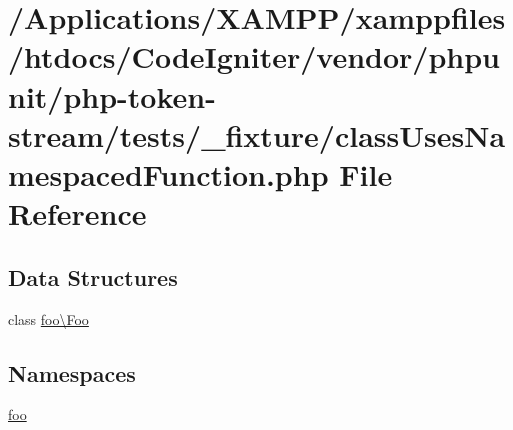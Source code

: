 \hypertarget{class_uses_namespaced_function_8php}{}\section{/\+Applications/\+X\+A\+M\+P\+P/xamppfiles/htdocs/\+Code\+Igniter/vendor/phpunit/php-\/token-\/stream/tests/\+\_\+fixture/class\+Uses\+Namespaced\+Function.php File Reference}
\label{class_uses_namespaced_function_8php}
\subsection*{Data Structures}
\begin{DoxyCompactItemize}
\item 
class \mbox{\hyperlink{classfoo_1_1_foo}{foo\textbackslash{}\+Foo}}
\end{DoxyCompactItemize}
\subsection*{Namespaces}
\begin{DoxyCompactItemize}
\item 
 \mbox{\hyperlink{namespacefoo}{foo}}
\end{DoxyCompactItemize}
